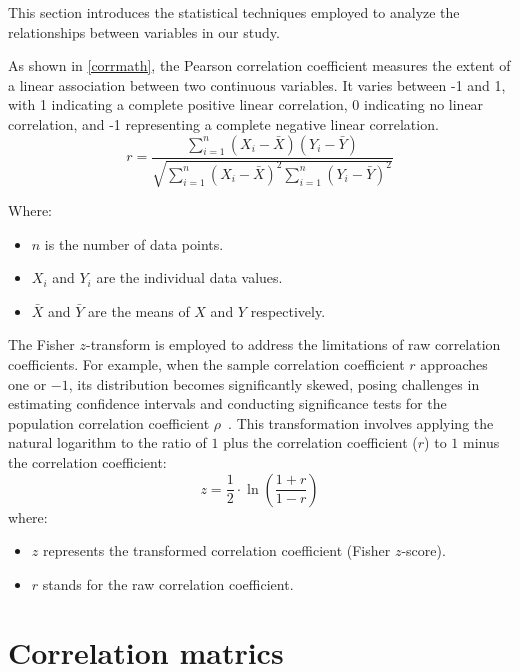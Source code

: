 This section introduces the statistical techniques employed to analyze the relationships between variables in our study.

As shown in \ref{corrmath}, the Pearson correlation coefficient measures the extent of a linear association between two continuous variables. It varies between -1 and 1, with 1 indicating a complete positive linear correlation, 0 indicating no linear correlation, and -1 representing a complete negative linear correlation.
\begin{equation}
    r = \frac{\sum_{i=1}^{n} (X_i - \bar{X})(Y_i - \bar{Y})}{\sqrt{\sum_{i=1}^{n} (X_i - \bar{X})^2 \sum_{i=1}^{n} (Y_i - \bar{Y})^2}}
\label{corrmath}
\end{equation}

Where:
\begin{itemize}

\item \quad \(n\) is the number of data points.
\item \quad\(X_i\) and \(Y_i\) are the individual data values.
\item \quad\(\bar{X}\) and \(\bar{Y}\) are the means of \(X\) and \(Y\) respectively.

\end{itemize}

The Fisher $z$-transform is employed to address the limitations of raw correlation coefficients. For example, when the sample correlation coefficient $r$ approaches one or $-1$, its distribution becomes significantly skewed, posing challenges in estimating confidence intervals and conducting significance tests for the population correlation coefficient $\rho$~\cite{fisher1915frequency}. This transformation involves applying the natural logarithm to the ratio of $1$ plus the correlation coefficient ($r$) to $1$ minus the correlation coefficient:
\begin{equation}
    z = \frac{1}{2} \cdot \ln \left( \frac{1+r}{1-r} \right)
\end{equation}
where:
\begin{itemize}
    \item \quad $z$ represents the transformed correlation coefficient (Fisher $z$-score).
    \item \quad $r$ stands for the raw correlation coefficient.
\end{itemize}

\section{Correlation matrics}

